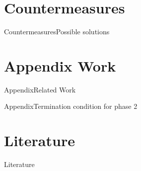 \documentclass[aspectratio=169, hyperref={colorlinks=true, allcolors=SecondaryColor}, c]{beamer}
\begin{document}
\section{Countermeasures}

\begin{frame}[fragile]{Countermeasures}{Possible solutions}
\end{frame}

\section{Appendix Work}

\begin{frame}[fragile]{Appendix}{Related Work}
\end{frame}

\begin{frame}[fragile]{Appendix}{Termination condition for phase 2}
\end{frame}

\section{Literature}

\begin{frame}[allowframebreaks]{Literature}
	\printbibliography
\end{frame}
%
%


\end{document}
